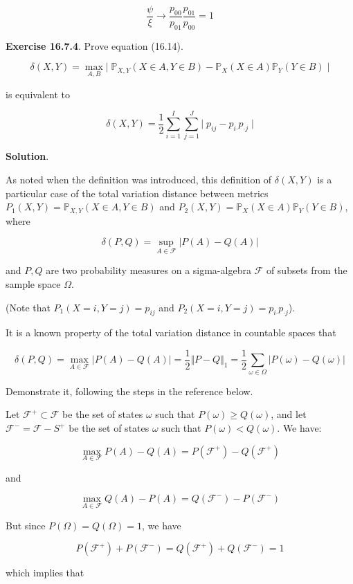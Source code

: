 \[ \frac{\psi}{\xi} \rightarrow  \frac{p_{00}}{p_{01}} \frac{p_{01}}{p_{00}} = 1 \]

\textbf{Exercise 16.7.4}. Prove equation (16.14).

\[ \delta(X, Y) = \max_{A, B} \Big|\; \mathbb{P}_{X, Y}(X \in A, Y \in B) - \mathbb{P}_X(X \in A) \mathbb{P}_Y(Y \in B) \;\Big| \]

is equivalent to

\[ \delta(X, Y) = \frac{1}{2} \sum_{i=1}^I \sum_{j=1}^J \Big|\; p_{ij} - p_{i\text{·}} p_{\text{·}j} \;\Big|\]

\textbf{Solution}.

As noted when the definition was introduced, this definition of
\(\delta(X, Y)\) is a particular case of the total variation distance
between metrics \(P_{1}(X, Y) = \mathbb{P}_{X, Y}(X \in A, Y \in B)\) and
\(P_{2}(X, Y) = \mathbb{P}_X(X \in A) \mathbb{P}_Y(Y \in B)\), where

\[ \delta(P, Q) = \sup_{A \in \mathcal{F}} |P(A) - Q(A)| \]

and \(P, Q\) are two probability measures on a sigma-algebra
\(\mathcal{F}\) of subsets from the sample space \(\Omega\).

(Note that \(P_{1}(X = i, Y = j) = p_{ij}\) and
\(P_{2}(X = i, Y = j) =  p_{i\text{·}} p_{\text{·}j}\)).

It is a known property of the total variation distance in countable
spaces that

\[ \delta(P, Q) = \max_{A \in \mathcal{F}} |P(A) - Q(A)| = \frac{1}{2} \Vert P - Q \Vert_{1} = \frac{1}{2} \sum_{\omega \in \Omega} \vert P(\omega) - Q(\omega) \vert\]

Demonstrate it, following the steps in the reference below.

Let \(\mathcal{F}^+ \subset \mathcal{F}\) be the set of states
\(\omega\) such that \(P(\omega) \geq Q(\omega)\), and let
\(\mathcal{F}^- = \mathcal{F} - S^+\) be the set of states \(\omega\)
such that \(P(\omega) < Q(\omega)\). We have:

\[ \max_{A \in \mathcal{F}} P(A) - Q(A) = P(\mathcal{F}^+) - Q(\mathcal{F}^+)\]

and

\[ \max_{A \in \mathcal{F}} Q(A) - P(A) = Q(\mathcal{F}^-) - P(\mathcal{F}^-)\]

But since \(P(\Omega) = Q(\Omega) = 1\), we have

\[ P(\mathcal{F}^+) + P(\mathcal{F}^-) = Q(\mathcal{F}^+) + Q(\mathcal{F}^-) = 1 \]

which implies that

